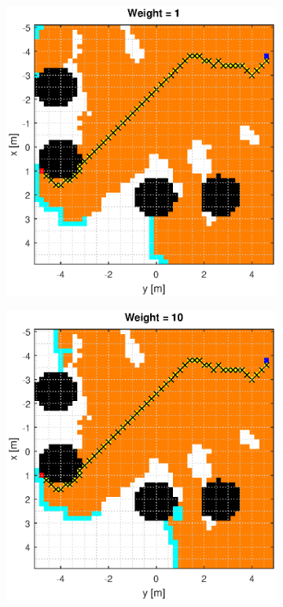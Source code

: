 \documentclass[Space3_Assign3.tex]{subfile}
\begin{document}
\begin{figure}
\centering
\caption{A* Euclidean Distance}
\label{Fig:A*eu}
\begin{subfigure}{0.49\linewidth}
\includegraphics[width = 1\linewidth]{Astar_euc_1.eps}
\end{subfigure}
\begin{subfigure}{0.49\linewidth}
\includegraphics[width = 1\linewidth]{Astar_euc_10.eps}

\end{subfigure}
\end{figure}
\end{document}
